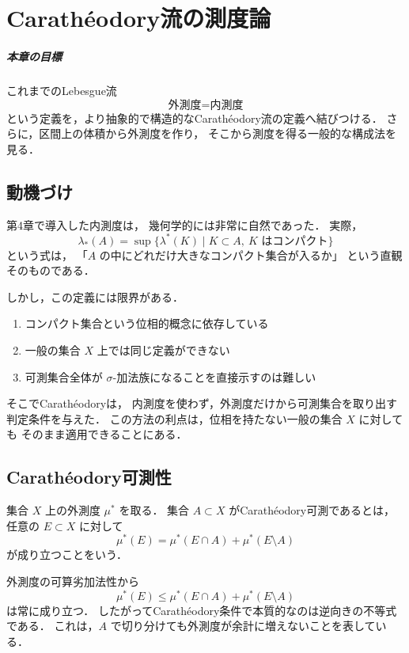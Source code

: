 \chapter{Carathéodory流の測度論}

\paragraph{本章の目標}
これまでのLebesgue流
\[
\text{外測度}=\text{内測度}
\]
という定義を，より抽象的で構造的なCarathéodory流の定義へ結びつける．
さらに，区間上の体積から外測度を作り，
そこから測度を得る一般的な構成法を見る．

\section{動機づけ}

第4章で導入した内測度は，
幾何学的には非常に自然であった．
実際，
\[
\lambda_*(A)
=
\sup\{\lambda^*(K)\mid K \subset A,\ K \text{ はコンパクト}\}
\]
という式は，
「$A$ の中にどれだけ大きなコンパクト集合が入るか」
という直観そのものである．

しかし，この定義には限界がある．
\begin{enumerate}
    \item コンパクト集合という位相的概念に依存している
    \item 一般の集合 $X$ 上では同じ定義ができない
    \item 可測集合全体が $\sigma$-加法族になることを直接示すのは難しい
\end{enumerate}

そこでCarathéodoryは，
内測度を使わず，外測度だけから可測集合を取り出す判定条件を与えた．
この方法の利点は，位相を持たない一般の集合 $X$ に対しても
そのまま適用できることにある．

\section{Carathéodory可測性}

\begin{definition}[Carathéodory可測]
集合 $X$ 上の外測度 $\mu^*$ を取る．
集合 $A \subset X$ がCarathéodory可測であるとは，
任意の $E \subset X$ に対して
\[
\mu^*(E)
=
\mu^*(E \cap A)+\mu^*(E \setminus A)
\]
が成り立つことをいう．
\end{definition}

\begin{remark}
外測度の可算劣加法性から
\[
\mu^*(E)
\le
\mu^*(E \cap A)+\mu^*(E \setminus A)
\]
は常に成り立つ．
したがってCarathéodory条件で本質的なのは逆向きの不等式である．
これは，$A$ で切り分けても外測度が余計に増えないことを表している．
\end{remark}

